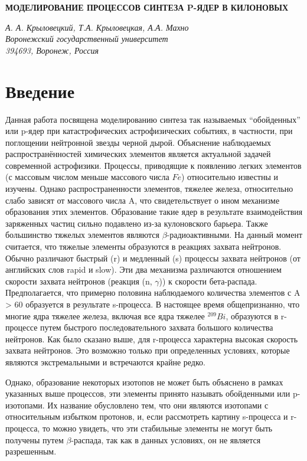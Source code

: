 \documentclass[14pt, a4paper]{article}
\begin{document}
\begin{center}
\large\bf МОДЕЛИРОВАНИЕ ПРОЦЕССОВ СИНТЕЗА P-ЯДЕР В КИЛОНОВЫХ
\end{center}
\begin{center}
{\it А. А. Крыловецкий, Т.А. Крыловецкая, А.А. Махно}\\
{\it\small Воронежский государственный университет \\
394693, Воронеж, Россия}
\end{center}
\section*{\centering Введение}
Данная работа посвящена моделированию синтеза так называемых ``обойденных'' или p-ядер при катастрофических астрофизических событиях, в частности, при поглощении нейтронной звезды черной дырой. Объяснение наблюдаемых распространённостей химических элементов является актуальной задачей современной астрофизики.  Процессы, приводящие к появлению легких элементов (с массовым числом меньше массового числа $Fe$) относительно известны и изучены. Однако распространенности элементов, тяжелее железа, относительно слабо зависят от массового числа A, что свидетельствует о ином механизме образования этих элементов. Образование такие ядер в результате взаимодействия заряженных частиц сильно подавлено из-за кулоновского барьера. Также большинство тяжелых элементов являются $\beta$-радиоактивными. На данный момент считается, что тяжелые элементы образуются в реакциях захвата нейтронов. Обычно различают быстрый (r) и медленный (s) процессы захвата нейтронов (от английских слов rapid и slow). Эти два механизма различаются отношением скорости захвата нейтронов (реакция (n, $\gamma$)) к скорости бета-распада. Предполагается, что примерно половина наблюдаемого количества элементов с A > 60 образуется в результате s-процесса. В настоящее время общепризнанно, что многие ядра тяжелее железа, включая все ядра тяжелее $^{209}Bi$, образуются в   r-процессе путем быстрого последовательного захвата большого количества нейтронов. Как было сказано выше, для r-процесса характерна высокая скорость захвата нейтронов. Это возможно только при определенных условиях, которые являются экстремальными и встречаются крайне редко.

Однако, образование некоторых изотопов не может быть объяснено в рамках указанных выше процессов, эти элементы принято называть обойденными или p-изо\-то\-па\-ми. Их название обусловлено тем, что они являются изотопами с относительным избытком протонов, и, если рассмотреть картину s-процесса и r-процесса, то можно увидеть, что эти стабильные элементы не могут быть получены путем $\beta$-распада, так как в данных условиях, он не является разрешенным.
\end{document}
